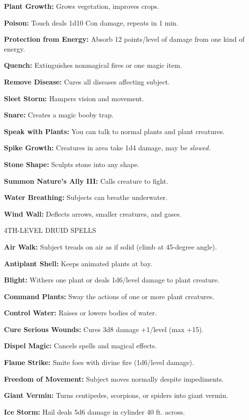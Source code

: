 \documentclass{article}
\begin{document}
\textbf{Plant Growth:} Grows vegetation, improves crops.

\textbf{Poison:} Touch deals 1d10 Con damage, repeats in 1 min.

\textbf{Protection from Energy:} Absorb 12 points/level of damage from one kind 
of energy.

\textbf{Quench:} Extinguishes nonmagical fires or one magic item.

\textbf{Remove Disease:} Cures all diseases affecting subject.

\textbf{Sleet Storm:} Hampers vision and movement.

\textbf{Snare:} Creates a magic booby trap.

\textbf{Speak with Plants:} You can talk to normal plants and plant creatures.

\textbf{Spike Growth:} Creatures in area take 1d4 damage, may be \textit{slowed.}

\textbf{Stone Shape:} Sculpts stone into any shape.

\textbf{Summon Nature's Ally III:} Calls creature to fight.

\textbf{Water Breathing:} Subjects can breathe underwater.

\textbf{Wind Wall:} Deflects arrows, smaller creatures, and gases.

4TH-LEVEL DRUID SPELLS

\textbf{Air Walk:} Subject treads on air as if solid (climb at 45-degree angle).

\textbf{Antiplant Shell:} Keeps animated plants at bay.

\textbf{Blight:} Withers one plant or deals 1d6/level damage to plant creature.

\textbf{Command Plants:} Sway the actions of one or more plant creatures.

\textbf{Control Water:} Raises or lowers bodies of water.

\textbf{Cure Serious Wounds:} Cures 3d8 damage +1/level (max +15).

\textbf{Dispel Magic:} Cancels spells and magical effects.

\textbf{Flame Strike:} Smite foes with divine fire (1d6/level damage).

\textbf{Freedom of Movement:} Subject moves normally despite impediments.

\textbf{Giant Vermin:} Turns centipedes, scorpions, or spiders into giant vermin.

\textbf{Ice Storm:} Hail deals 5d6 damage in cylinder 40 ft. across.
\end{document}
